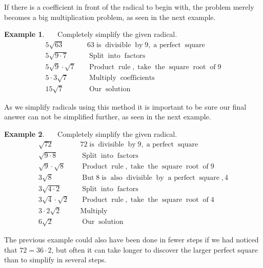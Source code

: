 \documentclass[12pt]{book}
\theoremstyle{definition}
\newtheorem{example}{Example}
\newcommand{\tmop}[1]{\ensuremath{\operatorname{#1}}}
\begin{document}
If there is a coefficient in front of the radical to begin with, the problem merely becomes a big multiplication problem, as seen in the next example.
\begin{example}~~~Completely simplify the given radical.
  \begin{eqnarray*}
    5 \sqrt{63} &  & 63 \tmop{is} \tmop{divisible} \tmop{by} 9, 
    \tmop{a~perfect} \tmop{square}\\
    5 \sqrt{9 \cdot 7} &  & \tmop{Split} \tmop{into} \tmop{factors}\\
    5 \sqrt{9} \cdot \sqrt{7} &  & \tmop{Product} \tmop{rule}, \tmop{take}
    \tmop{the} \tmop{square} \tmop{root} \tmop{of} 9\\
    5 \cdot 3 \sqrt{7} &  & \tmop{Multiply} \tmop{coefficients}\\
    15 \sqrt{7} &  & \tmop{Our} \tmop{solution}
  \end{eqnarray*}
\end{example}
As we simplify radicals using this method it is important to be sure our final answer can not be simplified further, as seen in the next example.
\begin{example}~~~Completely simplify the given radical.
  \begin{eqnarray*}
    \sqrt{72} &  & 72 \tmop{is} \tmop{divisible} \tmop{by} 9, \tmop{a~perfect}
    \tmop{square}\\
    \sqrt{9 \cdot 8} &  & \tmop{Split} \tmop{into} \tmop{factors}\\
    \sqrt{9} \cdot \sqrt{8} &  & \tmop{Product} \tmop{rule}, \tmop{take}
    \tmop{the} \tmop{square} \tmop{root} \tmop{of} 9\\
    3 \sqrt{8} &  & \tmop{But} 8 \tmop{is} \tmop{also} \tmop{divisible}
    \tmop{by} \tmop{a~perfect} \tmop{square}, 4\\
    3 \sqrt{4 \cdot 2} &  & \tmop{Split} \tmop{into} \tmop{factors}\\
    3 \sqrt{4} \cdot \sqrt{2} &  & \tmop{Product} \tmop{rule}, \tmop{take}
    \tmop{the} \tmop{square} \tmop{root} \tmop{of} 4\\
    3 \cdot 2 \sqrt{2} &  & \tmop{Multiply}\\
    6 \sqrt{2} &  & \tmop{Our} \tmop{solution}
  \end{eqnarray*}
\end{example}
The previous example could also have been done in fewer steps if we had noticed that $72 = 36 \cdot 2$, but often it can take longer to discover the larger perfect square than to simplify in several steps.\par
\end{document}
